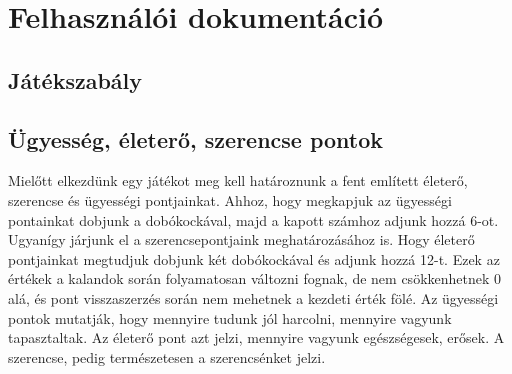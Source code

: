 \documentclass{article}
\begin{document}
  \section{Felhasználói dokumentáció}

    \subsection{Játékszabály}
  
      \subsection{Ügyesség, életerő, szerencse pontok}
        Mielőtt elkezdünk egy játékot meg kell határoznunk a fent említett
        életerő, szerencse és ügyességi pontjainkat. Ahhoz, hogy megkapjuk az
        ügyességi pontainkat dobjunk a dobókockával, majd a kapott számhoz
        adjunk hozzá 6-ot. Ugyanígy járjunk el a szerencsepontjaink
        meghatározásához is. Hogy életerő pontjainkat megtudjuk dobjunk két
        dobókockával és adjunk hozzá 12-t. Ezek az értékek a kalandok során
        folyamatosan változni fognak, de nem csökkenhetnek 0 alá, és pont
        visszaszerzés során nem mehetnek a kezdeti érték fölé. Az ügyességi
        pontok mutatják, hogy mennyire tudunk jól harcolni, mennyire vagyunk
        tapasztaltak. Az életerő pont azt jelzi, mennyire vagyunk
        egészségesek, erősek. A szerencse, pedig természetesen a szerencsénket
        jelzi.
    
\end{document}
